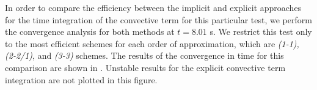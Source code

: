 

In order to compare the efficiency between the implicit and explicit approaches for the time integration of the convective term for this particular test, we perform the convergence analysis for both methods at $t=8.01$ s. We restrict this test only to the most efficient schemes for each order of approximation, which are \textit{(1-1), (2-2/1)}, and \textit{(3-3)} schemes. %
The results of the convergence in time for this comparison are shown in . Unstable results for the explicit convective term integration are not plotted in this figure.

